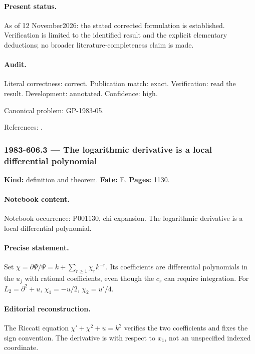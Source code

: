 \paragraph{Present status.} As of 12 November2026: the stated corrected formulation is established. Verification is limited to the identified result and the explicit elementary deductions; no broader literature-completeness claim is made.

\paragraph{Audit.} Literal correctness: correct. Publication match: exact. Verification: read the result. Development: annotated. Confidence: high.

\noindent Canonical problem: GP-1983-05.\par

\noindent References: \citep{cherednik1978differential}.\par

\subsubsection{1983-606.3 --- The logarithmic derivative is a local differential polynomial}

\label{item:1983-606.3}

\noindent\textbf{Kind:} definition and theorem. \textbf{Fate:} E. \textbf{Pages:} 1130.\par

\paragraph{Notebook content.} Notebook occurrence: P001130, chi expansion. The logarithmic derivative is a local differential polynomial.

\paragraph{Precise statement.} Set \(\chi=\partial\Psi/\Psi=k+\sum_{r\ge1}\chi_rk^{-r}\). Its coefficients are differential polynomials in the \(u_j\) with rational coefficients, even though the \(c_r\) can require integration. For \(L_2=\partial^2+u\), \(\chi_1=-u/2\), \(\chi_2=u'/4\).

\paragraph{Editorial reconstruction.} The Riccati equation \(\chi'+\chi^2+u=k^2\) verifies the two coefficients and fixes the sign convention. The derivative is with respect to \(x_1\), not an unspecified indexed coordinate.

